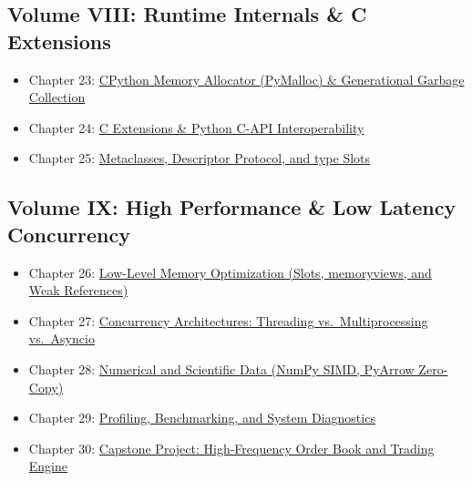 \hypertarget{volume-viii-runtime-internals-c-extensions}{%
\subsection{Volume VIII: Runtime Internals \& C
Extensions}\label{volume-viii-runtime-internals-c-extensions}}

\begin{itemize}
\tightlist
\item
  Chapter 23:
  \protect\hyperlink{chapter-23-cpython-memory-allocator-pymalloc--generational-garbage-collection}{CPython
  Memory Allocator (PyMalloc) \& Generational Garbage Collection}
\item
  Chapter 24:
  \protect\hyperlink{chapter-24-c-extensions-and-interoperability-layers}{C
  Extensions \& Python C-API Interoperability}
\item
  Chapter 25:
  \protect\hyperlink{chapter-25-metaclasses-descriptor-protocol-and-type-slots}{Metaclasses,
  Descriptor Protocol, and type Slots}
\end{itemize}

\hypertarget{volume-ix-high-performance-low-latency-concurrency}{%
\subsection{Volume IX: High Performance \& Low Latency
Concurrency}\label{volume-ix-high-performance-low-latency-concurrency}}

\begin{itemize}
\tightlist
\item
  Chapter 26:
  \protect\hyperlink{chapter-26-low-level-memory-optimization-slots-memoryviews-and-weak-references}{Low-Level
  Memory Optimization (Slots, memoryviews, and Weak References)}
\item
  Chapter 27:
  \protect\hyperlink{chapter-27-concurrency-architectures-threading-vs-multiprocessing-vs-asyncio}{Concurrency
  Architectures: Threading vs.~Multiprocessing vs.~Asyncio}
\item
  Chapter 28:
  \protect\hyperlink{chapter-28-numerical-and-scientific-data-numpy-simd-pyarrow-zero-copy}{Numerical
  and Scientific Data (NumPy SIMD, PyArrow Zero-Copy)}
\item
  Chapter 29:
  \protect\hyperlink{chapter-29-profiling-benchmarking-and-system-diagnostics}{Profiling,
  Benchmarking, and System Diagnostics}
\item
  Chapter 30:
  \protect\hyperlink{chapter-30-capstone-project-high-frequency-order-book-and-trading-engine}{Capstone
  Project: High-Frequency Order Book and Trading Engine}
\end{itemize}

